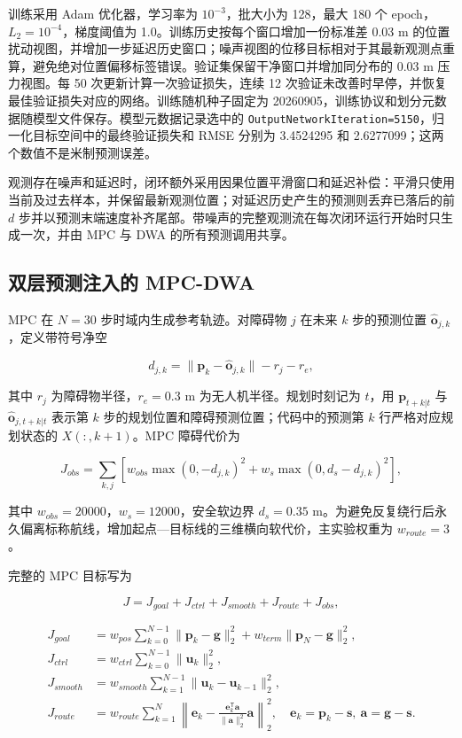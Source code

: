 \documentclass[10pt,a4paper,twocolumn]{ctexart}
\begin{document}
训练采用 Adam 优化器，学习率为 $10^{-3}$，批大小为 128，最大 180 个 epoch，$L_2=10^{-4}$，梯度阈值为 1.0。训练历史按每个窗口增加一份标准差 0.03 m 的位置扰动视图，并增加一步延迟历史窗口；噪声视图的位移目标相对于其最新观测点重算，避免绝对位置偏移标签错误。验证集保留干净窗口并增加同分布的 0.03 m 压力视图。每 50 次更新计算一次验证损失，连续 12 次验证未改善时早停，并恢复最佳验证损失对应的网络。训练随机种子固定为 20260905，训练协议和划分元数据随模型文件保存。模型元数据记录选中的 \texttt{OutputNetworkIteration=5150}，归一化目标空间中的最终验证损失和 RMSE 分别为 3.4524295 和 2.6277099；这两个数值不是米制预测误差。

观测存在噪声和延迟时，闭环额外采用因果位置平滑窗口和延迟补偿：平滑只使用当前及过去样本，并保留最新观测位置；对延迟历史产生的预测则丢弃已落后的前 $d$ 步并以预测末端速度补齐尾部。带噪声的完整观测流在每次闭环运行开始时只生成一次，并由 MPC 与 DWA 的所有预测调用共享。

\subsection{双层预测注入的 MPC-DWA}

MPC 在 $N=30$ 步时域内生成参考轨迹。对障碍物 $j$ 在未来 $k$ 步的预测位置 $\hat{\mathbf{o}}_{j,k}$，定义带符号净空

\[
d_{j,k}=\|\mathbf{p}_k-\hat{\mathbf{o}}_{j,k}\|-r_j-r_e,
\]

其中 $r_j$ 为障碍物半径，$r_e=0.3$ m 为无人机半径。规划时刻记为 $t$，用 $\mathbf{p}_{t+k|t}$ 与 $\hat{\mathbf{o}}_{j,t+k|t}$ 表示第 $k$ 步的规划位置和障碍预测位置；代码中的预测第 $k$ 行严格对应规划状态的 $X(:,k+1)$。MPC 障碍代价为

\[
J_{obs}=\sum_{k,j}\left[w_{obs}\max(0,-d_{j,k})^2
+w_s\max(0,d_s-d_{j,k})^2\right],
\]

其中 $w_{obs}=20000$，$w_s=12000$，安全软边界 $d_s=0.35$ m。为避免反复绕行后永久偏离标称航线，增加起点—目标线的三维横向软代价，主实验权重为 $w_{route}=3$。

完整的 MPC 目标写为

\[
J=J_{goal}+J_{ctrl}+J_{smooth}+J_{route}+J_{obs},
\]

\[
\begin{aligned}
J_{goal}&=w_{pos}\sum_{k=0}^{N-1}\|\mathbf p_k-\mathbf g\|_2^2+w_{term}\|\mathbf p_N-\mathbf g\|_2^2,\\
J_{ctrl}&=w_{ctrl}\sum_{k=0}^{N-1}\|\mathbf u_k\|_2^2,\\
J_{smooth}&=w_{smooth}\sum_{k=1}^{N-1}\|\mathbf u_k-\mathbf u_{k-1}\|_2^2,\\
J_{route}&=w_{route}\sum_{k=1}^{N}\left\|\mathbf e_k-\frac{\mathbf e_k^{\mathsf T}\mathbf a}{\|\mathbf a\|_2^2}\mathbf a\right\|_2^2,
\quad \mathbf e_k=\mathbf p_k-\mathbf s,\ \mathbf a=\mathbf g-\mathbf s.
\end{aligned}
\]
\end{document}
